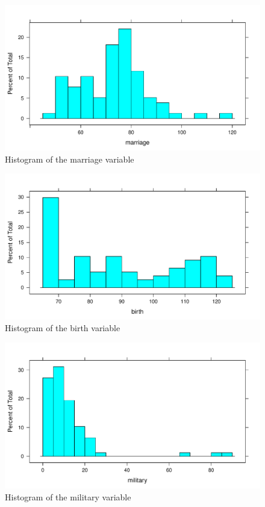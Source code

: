 \documentclass{article}\usepackage[]{graphicx}\usepackage[]{color}
\makeatletter
\def\maxwidth{ %
  \ifdim\Gin@nat@width>\linewidth
    \linewidth
  \else
    \Gin@nat@width
  \fi
}
\newenvironment{knitrout}{}{} %
\makeatother
\begin{document}
\begin{knitrout}
\begin{figure}
\includegraphics[width=\maxwidth]{figure/histograms-4} \caption[Histogram of the marriage variable]{Histogram of the marriage variable}\label{fig:histograms4}
\end{figure}

\begin{figure}
\includegraphics[width=\maxwidth]{figure/histograms-5} \caption[Histogram of the birth variable]{Histogram of the birth variable}\label{fig:histograms5}
\end{figure}

\begin{figure}
\includegraphics[width=\maxwidth]{figure/histograms-6} \caption[Histogram of the military variable]{Histogram of the military variable}\label{fig:histograms6}
\end{figure}


\end{knitrout}
\end{document}
